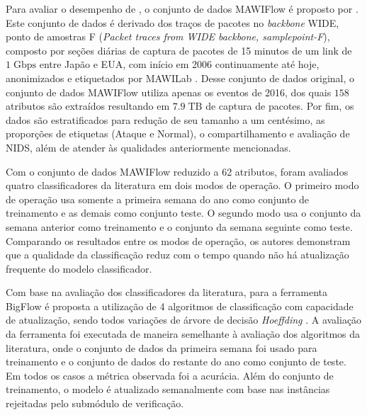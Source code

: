 Para avaliar o desempenho de \nids, o conjunto de dados MAWIFlow é proposto por .
Este conjunto de dados é derivado dos traços de pacotes no \emph{backbone} WIDE, ponto de amostras F
(\emph{Packet traces from WIDE backbone, samplepoint-F}), composto por
seções diárias de captura de pacotes de 15 minutos de um link de $1\;
\mathrm{Gbps}$ entre Japão e EUA, com início em 2006 continuamente até hoje,
anonimizados e etiquetados por MAWILab \cite{mawiSamplepointF,Fontugne2010}.
Desse conjunto de dados original, o conjunto de dados MAWIFlow utiliza apenas os eventos de 2016,
dos quais $158$ atributos são extraídos resultando em $7.9\;\mathrm{TB}$ de captura de pacotes.
Por fim, os dados são estratificados para redução de seu tamanho a um
centésimo,  as proporções de etiquetas (Ataque e Normal),  o
compartilhamento e avaliação de NIDS, além de atender às qualidades anteriormente
mencionadas.


Com o conjunto de dados MAWIFlow reduzido a 62 atributos, foram avaliados quatro
classificadores da literatura em dois modos de operação.
O primeiro modo de operação usa somente a primeira semana do ano como conjunto
de treinamento e as demais como conjunto teste.
O segundo modo usa o conjunto da semana anterior como treinamento e o
conjunto da semana seguinte como teste.
Comparando os resultados entre os modos de operação, os autores demonstram que a qualidade da
classificação reduz com o tempo quando não há atualização frequente do modelo
classificador.

Com base na avaliação dos classificadores da literatura, para a ferramenta
BigFlow é proposta a utilização de 4 algoritmos de classificação com capacidade
de atualização, sendo todos variações de árvore de decisão
\emph{Hoeffding} \cite{Viegas2019,Domingos2000}.
A avaliação da ferramenta foi executada de maneira semelhante à avaliação
dos algoritmos da literatura, onde o conjunto de dados da primeira semana foi
usado para treinamento e o conjunto de dados do restante do ano como conjunto
de teste. Em todos os casos a métrica observada foi a acurácia.
Além do conjunto de treinamento, o modelo é atualizado semanalmente com base nas
instâncias rejeitadas pelo submódulo de verificação. 

